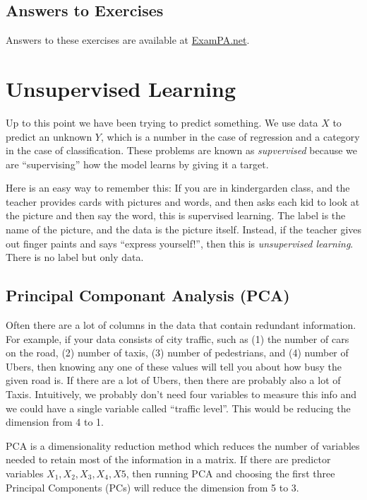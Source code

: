 \documentclass[openany]{book}
\begin{document}
\hypertarget{answers-to-exercises-1}{%
\section{Answers to Exercises}\label{answers-to-exercises-1}}

Answers to these exercises are available at \href{https://exampa.net/pricing}{ExamPA.net}.

\hypertarget{unsupervised-learning}{%
\chapter{Unsupervised Learning}\label{unsupervised-learning}}

Up to this point we have been trying to predict something. We use data \(X\) to predict an unknown \(Y\), which is a number in the case of regression and a category in the case of classification. These problems are known as \emph{supvervised} because we are ``supervising'' how the model learns by giving it a target.

Here is an easy way to remember this: If you are in kindergarden class, and the teacher provides cards with pictures and words, and then asks each kid to look at the picture and then say the word, this is supervised learning. The label is the name of the picture, and the data is the picture itself. Instead, if the teacher gives out finger paints and says ``express yourself!'', then this is \emph{unsupervised learning}. There is no label but only data.

\hypertarget{principal-componant-analysis-pca}{%
\section{Principal Componant Analysis (PCA)}\label{principal-componant-analysis-pca}}

Often there are a lot of columns in the data that contain redundant information. For example, if your data consists of city traffic, such as (1) the number of cars on the road, (2) number of taxis, (3) number of pedestrians, and (4) number of Ubers, then knowing any one of these values will tell you about how busy the given road is. If there are a lot of Ubers, then there are probably also a lot of Taxis. Intuitively, we probably don't need four variables to measure this info and we could have a single variable called ``traffic level''. This would be reducing the dimension from 4 to 1.

PCA is a dimensionality reduction method which reduces the number of variables needed to retain most of the information in a matrix. If there are predictor variables \(X_1, X_2, X_3, X_4, X5\), then running PCA and choosing the first three Principal Components (PCs) will reduce the dimension from 5 to 3.
\end{document}
